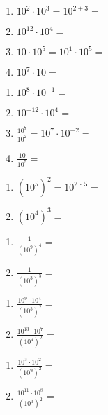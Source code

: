 \documentclass[task=1]{exercise}
\begin{document}
  \task[Vereinfache.]
  \begin{minipage}{.4\linewidth}
   \begin{enumerate}
    \item $10^2 \cdot 10^3 = 10^{2+3} =$
    \item $10^{12} \cdot 10^4 =$
    \item $10 \cdot 10^5 = 10^1 \cdot 10^5 =$
    \item $10^7 \cdot 10 =$
   \end{enumerate} 
  \end{minipage}
  \hfill
  \begin{minipage}{.4\linewidth}
   \begin{enumerate}\addtocounter{enumi}{5}
    \item $10^8 \cdot 10^{-1} =$
    \item $10^{-12} \cdot 10^4 =$
    \item $\frac{10^7}{10^2} = 10^7 \cdot 10^{-2} =$
    \item $\frac{10}{10^5} =$
   \end{enumerate} 
  \end{minipage}
  
  \task[Vereinfache.]
  \begin{minipage}{.4\linewidth}
   \begin{enumerate}
    \item $\displaystyle \left( 10^5\right)^2 = 10^{2\,\cdot\, 5} =$
    \item $\displaystyle \left( 10^4\right)^3 = $
   \end{enumerate} 
  \end{minipage}
  \hfill
  \begin{minipage}{.4\linewidth}
   \begin{enumerate}\addtocounter{enumi}{5}
    \item $\displaystyle \frac{1}{\left( 10^9\right)^4} = $
    \item $\displaystyle \frac{1}{\left( 10^3\right)^5} = $
   \end{enumerate} 
  \end{minipage} 
  
  \task[Vereinfache.]
  \begin{minipage}{.4\linewidth}
   \begin{enumerate}
    \item $\displaystyle \frac{10^9 \cdot 10^4}{\left( 10^5\right)^2} = $
    \item $\displaystyle \frac{10^{13} \cdot 10^7}{\left( 10^4\right)^2} = $
   \end{enumerate} 
  \end{minipage}
  \hfill
  \begin{minipage}{.4\linewidth}
   \begin{enumerate}\addtocounter{enumi}{5}
    \item $\displaystyle \frac{10^3 \cdot 10^2}{\left( 10^9\right)^2} = $
    \item $\displaystyle \frac{10^{11} \cdot 10^8}{\left( 10^3\right)^2} = $
   \end{enumerate} 
  \end{minipage}
  
\end{document}
